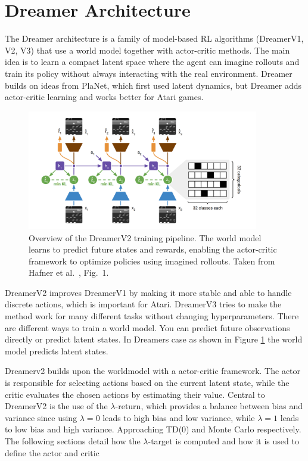 \documentclass[
	english,
	ruledheaders=section,
	class=report,
	thesis={type=master},
	accentcolor=9c,
	custommargins=true,
	marginpar=false,
	parskip=half-,
	fontsize=11pt,
]{tudapub}
\begin{document}
\section{Dreamer Architecture}
\label{sec:dreamer_architecture}

The Dreamer architecture is a family of model-based RL algorithms (DreamerV1,
V2, V3) that use a world model together with actor-critic methods. The main
idea is to learn a compact latent space where the agent can imagine rollouts
and train its policy without always interacting with the real environment.
Dreamer builds on ideas from PlaNet, which first used latent dynamics, but
Dreamer adds actor-critic learning and works better for Atari games.

\begin{figure}[ht]
	\centering
	\includegraphics[width=0.9\textwidth]{images/DreamerFlow.png}
	\caption{Overview of the DreamerV2 training pipeline. The world model learns to predict future states and rewards, enabling the actor-critic framework to optimize policies using imagined rollouts. Taken from Hafner et al.~\cite{hafner2021mastering}, Fig.~1.}
	\label{fig:dreamer_flow}
\end{figure}

DreamerV2 improves DreamerV1 by making it more stable and able to handle
discrete actions, which is important for Atari. DreamerV3 tries to make the
method work for many different tasks without changing hyperparameters. There
are different ways to train a world model. You can predict future observations
directly or predict latent states. In Dreamers case as shown in Figure
\ref{fig:dreamer_flow} the world model predicts latent states.

Dreamerv2 builds upon the worldmodel with a actor-critic framework. The actor
is responsible for selecting actions based on the current latent state, while
the critic evaluates the chosen actions by estimating their value. Central to DreamerV2 is the
use of the $\lambda$-return, which provides a balance between bias and variance
since using $\lambda=0$ leads to high bias and low variance, while $\lambda=1$ leads to low bias and high variance. Approaching
TD(0) and Monte Carlo respectively. The following sections detail how the
$\lambda$-target is computed and how it is used to define the actor and critic
\end{document}
